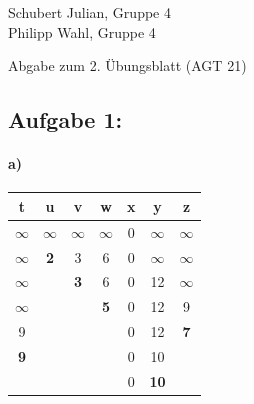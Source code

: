 \documentclass[a4paper]{article}
\begin{document}
\begin{small}
	\noindent
	Schubert Julian, Gruppe 4 \\
	Philipp Wahl, Gruppe 4
\end{small}
\bigskip

\begin{center}
	\LARGE Abgabe zum 2. Übungsblatt (AGT 21)
\end{center}
\smallskip

\subsection*{Aufgabe 1:}

\paragraph{a)}
\begin{tabular}{ |c | c | c | c | c | c | c |}
    \hline
    \textbf{t}  & \textbf{u}& \textbf{v}& \textbf{w}& \textbf{x}& \textbf{y}& \textbf{z} \\
    \hline
    $\infty$    & $\infty$  & $\infty$  & $\infty$  & 0         & $\infty$  & $\infty$ \\
    $\infty$    & \textbf{2}& 3         & 6         & 0         & $\infty$  & $\infty$ \\
    $\infty$    &           &\textbf{3} & 6         & 0         & 12        & $\infty$ \\
    $\infty$    &           &           & \textbf{5}& 0         & 12        & 9 \\
    9           &           &           &           & 0         & 12        &\textbf{7} \\
    \textbf{9}  &           &           &           & 0         & 10        & \\
                &           &           &           & 0         & \textbf{10}& \\
    \hline
\end{tabular}
\end{document}
